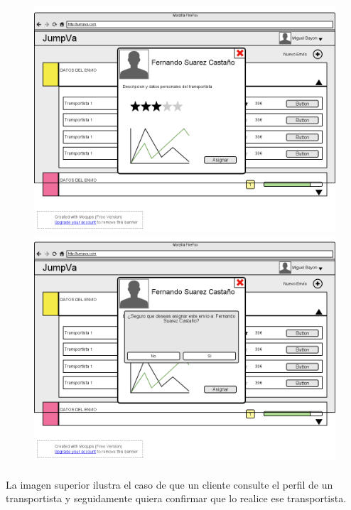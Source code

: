 \documentclass[10pt, a4paper,spanish]{article}
\begin{document}
			\begin{figure}[H]
				\centering
				\begin{minipage}[b]{0.49\textwidth}
					\includegraphics[width=\textwidth]{res/DetallesTransportista.png}

				\end{minipage}
				\begin{minipage}[b]{0.49\textwidth}
					\includegraphics[width=\textwidth]{res/ConfirmacionAsignacion.png}

				\end{minipage}
			\end{figure}

			\paragraph{}
			La imagen superior ilustra el caso de que un cliente consulte el perfil de un transportista y seguidamente quiera confirmar que lo realice ese transportista.
\end{document}
